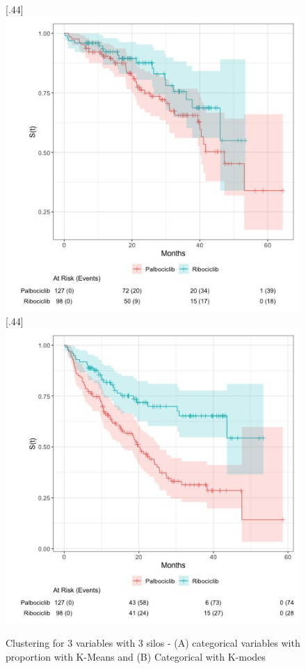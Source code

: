 
\begin{figure}[ht]
\caption{Clustering for 3 variables with 3 silos - (A) categorical variables with  proportion with K-Means and (B)  Categorical with K-modes  }\label{fig:interest} 
  [.44\linewidth]{%
    \includegraphics[width=\linewidth]{figures/interest_curve_OS.jpeg}%
  }%
  \hfill
  [.44\linewidth]{%
    \includegraphics[width=\linewidth]{figures/interest_curve_PFS.jpeg}%
  }
\end{figure}


